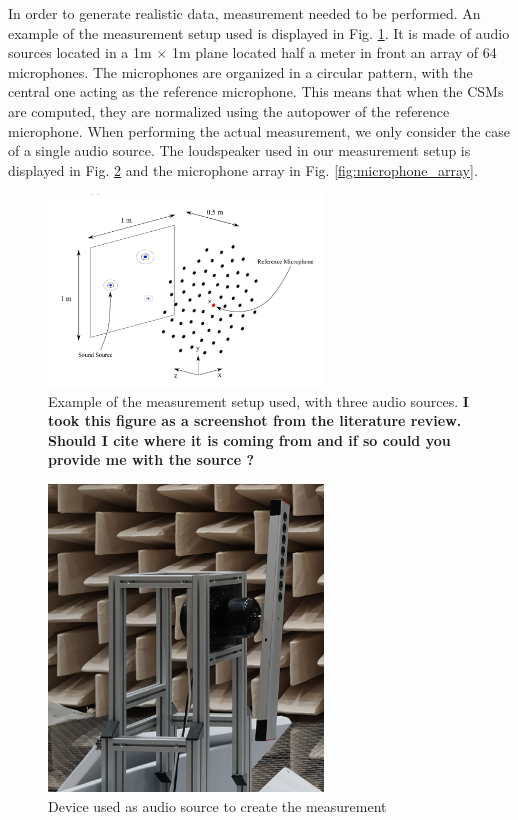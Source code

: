 \documentclass[11pt,a4paper,twoside]{report}
\begin{document}
In order to generate realistic data, measurement needed to be performed. An example of the measurement setup used is displayed in Fig. \ref{fig:full_measurement_setup}. It is made of audio sources located in a 1m $\times$ 1m plane located half a meter in front an array of 64 microphones. The microphones are organized in a circular pattern, with the central one acting as the reference microphone. This means that when the CSMs are computed, they are normalized using the autopower of the reference microphone. When performing the actual measurement, we only consider the case of a single audio source. The loudspeaker used in our measurement setup is displayed in Fig. \ref{fig:source} and the microphone array in Fig. \ref{fig:microphone_array}.


\begin{figure}
    \centering
    \includegraphics[width=0.65\textwidth]{figs/full_measurement_setup.png}
    \caption{Example of the measurement setup used, with three audio sources. \textbf{I took this figure as a screenshot from the literature review. Should I cite where it is coming from and if so could you provide me with the source ?}}
    \label{fig:full_measurement_setup}
\end{figure} 

\begin{figure}
    \centering
    \includegraphics[width=0.65\textwidth]{figs/source.png}
    \caption{Device used as audio source to create the measurement}
    \label{fig:source}
\end{figure}
\end{document}
